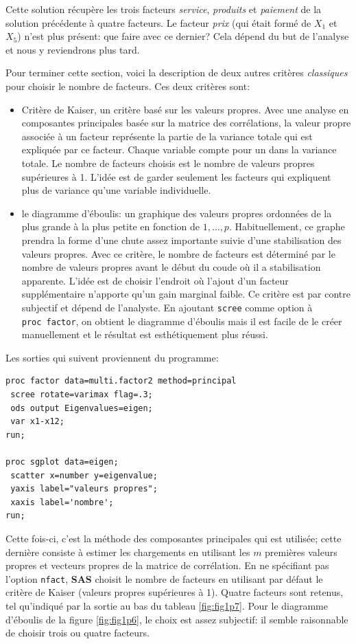 \documentclass[
]{book}
\providecommand{\tightlist}{%
  \setlength{\itemsep}{0pt}\setlength{\parskip}{0pt}}
\theoremstyle{definition}
\theoremstyle{definition}
\theoremstyle{definition}
\theoremstyle{remark}
\begin{document}
Cette solution récupère les trois facteurs \emph{service}, \emph{produits} et \emph{paiement} de la solution précédente à quatre facteurs. Le facteur \emph{prix} (qui était formé de \(X_1\) et \(X_5\)) n'est plus présent: que faire avec ce dernier? Cela dépend du but de l'analyse et nous y reviendrons plus tard.

Pour terminer cette section, voici la description de deux autres
critères \emph{classiques} pour choisir le nombre de facteurs. Ces deux critères sont:

\begin{itemize}
\tightlist
\item
  Critère de Kaiser, un critère basé sur les valeurs propres. Avec une analyse en composantes principales basée sur la matrice des corrélations, la valeur propre associée à un facteur représente la partie de la variance totale qui est expliquée par ce facteur. Chaque variable compte pour un dans la variance totale. Le nombre de facteurs choisis est le nombre de valeurs propres supérieures à 1. L'idée est de garder seulement les facteurs qui expliquent plus de variance qu'une variable individuelle.
\item
  le diagramme d'éboulis: un graphique des valeurs propres ordonnées de la plus grande à la plus petite en fonction de \(1, \ldots, p\). Habituellement, ce graphe prendra la forme d'une chute assez importante suivie d'une stabilisation des valeurs propres. Avec ce critère, le nombre de facteurs est déterminé par le nombre de valeurs propres avant le début du coude où il a stabilisation apparente. L'idée est de choisir l'endroit où l'ajout d'un facteur supplémentaire n'apporte qu'un gain marginal faible. Ce critère est par contre subjectif et dépend de l'analyste. En ajoutant \texttt{scree} comme option à \texttt{proc\ factor}, on obtient le diagramme d'éboulis mais il est facile de le créer manuellement et le résultat est esthétiquement plus réussi.
\end{itemize}

Les sorties qui suivent proviennent du programme:

\begin{verbatim}
proc factor data=multi.factor2 method=principal
 scree rotate=varimax flag=.3;
 ods output Eigenvalues=eigen;
 var x1-x12;
run; 

proc sgplot data=eigen;
 scatter x=number y=eigenvalue;
 yaxis label="valeurs propres";
 xaxis label='nombre';
run;
\end{verbatim}

Cette fois-ci, c'est la méthode des composantes principales qui est utilisée; cette dernière consiste à estimer les chargements en utilisant les \(m\) premières valeurs propres et vecteurs propres de la matrice de corrélation. En ne spécifiant pas l'option \texttt{nfact}, \textbf{SAS} choisit le nombre de facteurs en utilisant par défaut le critère de Kaiser (valeurs propres supérieures à 1). Quatre facteurs sont retenus, tel qu'indiqué par la sortie au bas du tableau \ref{fig:fig1p7}. Pour le diagramme d'éboulis de la figure \ref{fig:fig1p6}, le choix est assez subjectif: il semble raisonnable de choisir trois ou quatre facteurs.
\end{document}
